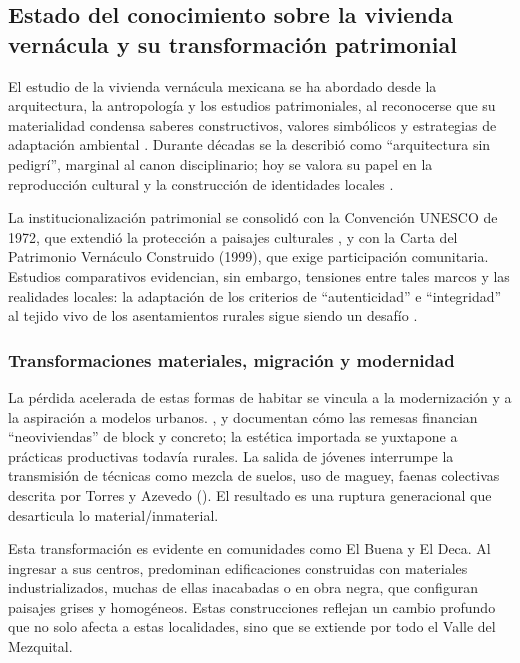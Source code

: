 \subsection{Estado del conocimiento sobre la vivienda vernácula y su transformación patrimonial}

El estudio de la vivienda vernácula mexicana se ha abordado desde la arquitectura, la antropología y los estudios patrimoniales, al reconocerse que su materialidad condensa saberes constructivos, valores simbólicos y estrategias de adaptación ambiental \cite{rudofsky1964, zarate2009arquitectura}.  Durante décadas se la describió como ``arquitectura sin pedigrí'', marginal al canon disciplinario; hoy se valora su papel en la reproducción cultural y la construcción de identidades locales \cite{gonzalez2017arquitectura, icomos1999carta}.  

La institucionalización patrimonial se consolidó con la Convención UNESCO de 1972, que extendió la protección a paisajes culturales \cite{UNESCO1972}, y con la Carta del Patrimonio Vernáculo Construido (1999), que exige participación comunitaria.  Estudios comparativos evidencian, sin embargo, tensiones entre tales marcos y las realidades locales: la adaptación de los criterios de ``autenticidad'' e ``integridad'' al tejido vivo de los asentamientos rurales sigue siendo un desafío \cite{venecia1964card, icomos1999carta, prats1998concepto}.

\subsubsection{Transformaciones materiales, migración y modernidad}

La pérdida acelerada de estas formas de habitar se vincula a la modernización y a la aspiración a modelos urbanos. \cite{alvarez2003maguey}, \cite{juarez2018transformacion} y \cite{boils2010remesas} documentan cómo las remesas financian ``neoviviendas'' de block y concreto; la estética importada se yuxtapone a prácticas productivas todavía rurales.  La salida de jóvenes interrumpe la transmisión de técnicas como mezcla de suelos, uso de maguey, faenas colectivas descrita por Torres y Azevedo (\citeyear{torres2021transmision}).  El resultado es una ruptura generacional que desarticula lo material/inmaterial.

Esta transformación es evidente en comunidades como El Buena y El Deca. Al ingresar a sus centros, predominan edificaciones construidas con materiales industrializados, muchas de ellas inacabadas o en obra negra, que configuran paisajes grises y homogéneos. Estas construcciones reflejan un cambio profundo que no solo afecta a estas localidades, sino que se extiende por todo el Valle del Mezquital.

